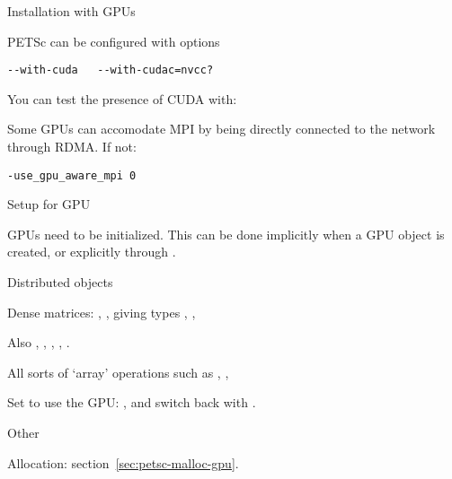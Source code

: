 
 {Installation with GPUs}

PETSc can be configured with options
\begin{verbatim}
--with-cuda   --with-cudac=nvcc?
\end{verbatim}
You can test the presence of CUDA with:


Some GPUs can accomodate MPI by being directly connected to the network
through  RDMA. If not:
\begin{verbatim}
-use_gpu_aware_mpi 0
\end{verbatim}

 {Setup for GPU}

GPUs need to be initialized.
This can be done implicitly when a GPU object is created,
or explicitly through .


 {Distributed objects}

Dense matrices:
,
,
giving types
,
,

Also
,
,
,
,
.

All sorts of `array' operations such as
,
,

Set  to use the GPU:
,
and switch back with
.

 {Other}

Allocation: section~\ref{sec:petsc-malloc-gpu}.
